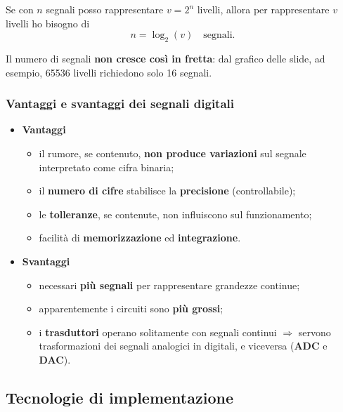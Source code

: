 \documentclass[12pt, a4paper]{article}
\begin{document}
\begin{tcolorbox}[colback=blue!5!white, colframe=blue!60!black, title=\textbf{Relazione tra livelli e segnali}]
Se con $n$ segnali posso rappresentare $v = 2^n$ livelli, allora per rappresentare $v$ livelli ho bisogno di
$$n = \log_2(v) \quad \text{segnali.}$$
\end{tcolorbox}

Il numero di segnali \textbf{non cresce così in fretta}: dal grafico delle slide, ad esempio, 65536 livelli richiedono solo 16 segnali.

\subsubsection{Vantaggi e svantaggi dei segnali digitali}
\begin{itemize}
    \item \textcolor{green!50!black}{\textbf{Vantaggi}}
    \begin{itemize}
        \item il rumore, se contenuto, \textbf{non produce variazioni} sul segnale interpretato come cifra binaria;
        \item il \textbf{numero di cifre} stabilisce la \textbf{precisione} (controllabile);
        \item le \textbf{tolleranze}, se contenute, non influiscono sul funzionamento;
        \item facilità di \textbf{memorizzazione} ed \textbf{integrazione}.
    \end{itemize}
    \item \textcolor{red!80!black}{\textbf{Svantaggi}}
    \begin{itemize}
        \item necessari \textbf{più segnali} per rappresentare grandezze continue;
        \item apparentemente i circuiti sono \textbf{più grossi};
        \item i \textbf{trasduttori} operano solitamente con segnali continui $\Rightarrow$ servono trasformazioni dei segnali analogici in digitali, e viceversa (\textbf{ADC} e \textbf{DAC}).
    \end{itemize}
\end{itemize}

\subsection{Tecnologie di implementazione}
\end{document}

